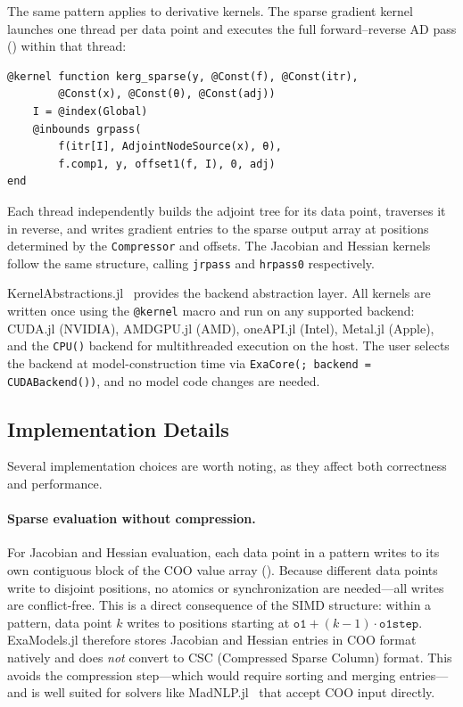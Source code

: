 \documentclass[11pt]{article}
\begin{document}
The same pattern applies to derivative kernels. The sparse gradient kernel launches one thread per data point and executes the full forward--reverse AD pass () within that thread:
\begin{lstlisting}
@kernel function kerg_sparse(y, @Const(f), @Const(itr),
        @Const(x), @Const(θ), @Const(adj))
    I = @index(Global)
    @inbounds grpass(
        f(itr[I], AdjointNodeSource(x), θ),
        f.comp1, y, offset1(f, I), 0, adj)
end
\end{lstlisting}
Each thread independently builds the adjoint tree for its data point, traverses it in reverse, and writes gradient entries to the sparse output array at positions determined by the \texttt{Compressor} and offsets. The Jacobian and Hessian kernels follow the same structure, calling \texttt{jrpass} and \texttt{hrpass0} respectively.

KernelAbstractions.jl~\citep{churavyKernelAbstractionsjl2025} provides the backend abstraction layer. All kernels are written once using the \texttt{@kernel} macro and run on any supported backend: CUDA.jl (NVIDIA), AMDGPU.jl (AMD), oneAPI.jl (Intel), Metal.jl (Apple), and the \texttt{CPU()} backend for multithreaded execution on the host. The user selects the backend at model-construction time via \texttt{ExaCore(; backend = CUDABackend())}, and no model code changes are needed.

\subsection{Implementation Details}
\label{sec:gpu:impl}

Several implementation choices are worth noting, as they affect both correctness and performance.

\paragraph{Sparse evaluation without compression.}
For Jacobian and Hessian evaluation, each data point in a pattern writes to its own contiguous block of the COO value array (). Because different data points write to disjoint positions, no atomics or synchronization are needed---all writes are conflict-free. This is a direct consequence of the SIMD structure: within a pattern, data point $k$ writes to positions starting at $\texttt{o1} + (k{-}1) \cdot \texttt{o1step}$. ExaModels.jl therefore stores Jacobian and Hessian entries in COO format natively and does \emph{not} convert to CSC (Compressed Sparse Column) format. This avoids the compression step---which would require sorting and merging entries---and is well suited for solvers like MadNLP.jl~\citep{shinMadNLPjl2025} that accept COO input directly.
\end{document}
